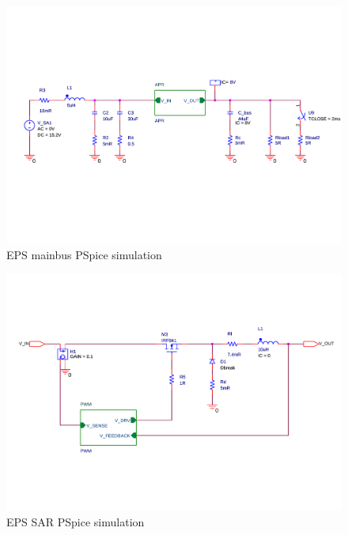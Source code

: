 \begin{figure}
\centering
\includegraphics[scale=0.6]{figures/fig_CDR_PSpice_Mainbus}
\caption{EPS mainbus PSpice simulation}
\label{fig:PSpice_mainbus}
\end{figure}
%
\begin{figure}
\centering
\includegraphics[scale=0.6]{figures/fig_CDR_PSpice_APR}
\caption{EPS SAR PSpice simulation}
\label{fig:PSpice_SAR}
\end{figure}
%
